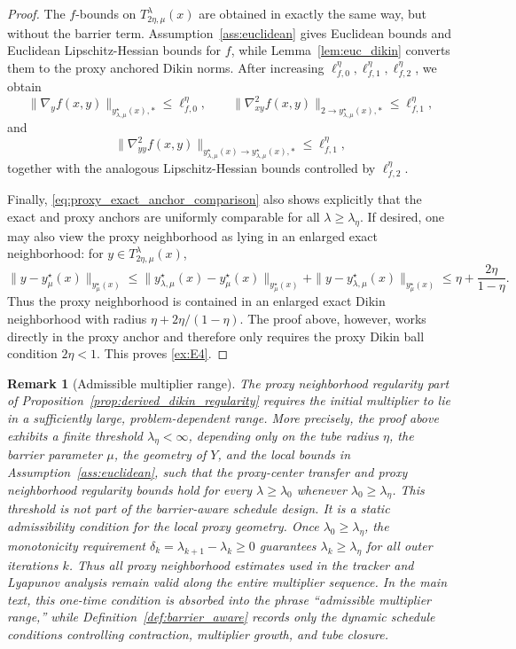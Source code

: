 \documentclass{article}
\newtheorem{remark}{Remark}
\begin{document}
\begin{proof}
The \(f\)-bounds on \(T_{2\eta,\mu}^{\lambda}(x)\) are obtained in exactly the same way, but without
the barrier term. Assumption~\ref{ass:euclidean} gives Euclidean bounds and Euclidean
Lipschitz-Hessian bounds for \(f\), while Lemma~\ref{lem:euc_dikin} converts them to the proxy
anchored Dikin norms. After increasing
\(\ell_{f,0}^\eta,\ell_{f,1}^\eta,\ell_{f,2}^\eta\), we obtain
\[
\|\nabla_y f(x,y)\|_{y_{\lambda,\mu}^\star(x),*}\le \ell_{f,0}^\eta,
\qquad
\|\nabla_{xy}^2 f(x,y)\|_{2\to y_{\lambda,\mu}^\star(x),*}\le \ell_{f,1}^\eta,
\]
and
\[
\|\nabla_{yy}^2 f(x,y)\|_{y_{\lambda,\mu}^\star(x)\to y_{\lambda,\mu}^\star(x),*}
\le
\ell_{f,1}^\eta,
\]
together with the analogous Lipschitz-Hessian bounds controlled by \(\ell_{f,2}^\eta\).

Finally, \eqref{eq:proxy_exact_anchor_comparison} also shows explicitly that the exact and proxy
anchors are uniformly comparable for all \(\lambda\ge\lambda_\eta\). If desired, one may also view
the proxy neighborhood as lying in an enlarged exact neighborhood: for
\(y\in T_{2\eta,\mu}^{\lambda}(x)\),
\[
\|y-y_\mu^\star(x)\|_{y_\mu^\star(x)}
\le
\|y_{\lambda,\mu}^\star(x)-y_\mu^\star(x)\|_{y_\mu^\star(x)}
+
\|y-y_{\lambda,\mu}^\star(x)\|_{y_\mu^\star(x)}
\le
\eta+\frac{2\eta}{1-\eta}.
\]
Thus the proxy neighborhood is contained in an enlarged exact Dikin neighborhood with radius
\(\eta+2\eta/(1-\eta)\). The proof above, however, works directly in the proxy anchor and therefore
only requires the proxy Dikin ball condition \(2\eta<1\). This proves \eqref{ex:E4}.

\end{proof}

\begin{remark}[Admissible multiplier range]
\label{rem:admissible_multiplier_range}
The proxy neighborhood regularity part of Proposition~\ref{prop:derived_dikin_regularity} requires the
initial multiplier to lie in a sufficiently large, problem-dependent range. More precisely, the proof
above exhibits a finite threshold \(\lambda_\eta<\infty\), depending only on the tube radius \(\eta\),
the barrier parameter \(\mu\), the geometry of \(Y\), and the local bounds in Assumption~\ref{ass:euclidean},
such that the proxy-center transfer and proxy neighborhood regularity bounds hold for every
\(\lambda\ge\lambda_0\) whenever \(\lambda_0\ge\lambda_\eta\). This threshold is not part of the \textit{barrier-aware} schedule design. It is a static admissibility condition
for the local proxy geometry. Once \(\lambda_0\ge\lambda_\eta\), the monotonicity requirement
\(\delta_k=\lambda_{k+1}-\lambda_k\ge0\) guarantees \(\lambda_k\ge\lambda_\eta\) for all outer
iterations \(k\). Thus all proxy neighborhood estimates used in the tracker and Lyapunov analysis remain
valid along the entire multiplier sequence. In the main text, this one-time condition is absorbed into
the phrase ``admissible multiplier range,'' while Definition~\ref{def:barrier_aware} records only the
dynamic schedule conditions controlling contraction, multiplier growth, and tube closure.
\end{remark}
\end{document}
